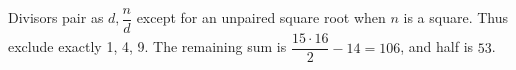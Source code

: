 Divisors pair as $d,\dfrac{n}{d}$ except for an unpaired square root when $n$ is a square. Thus exclude exactly 1, 4, 9. The remaining sum is $\dfrac{15\cdot16}{2}-14=106$, and half is $\boxed{53}$.
